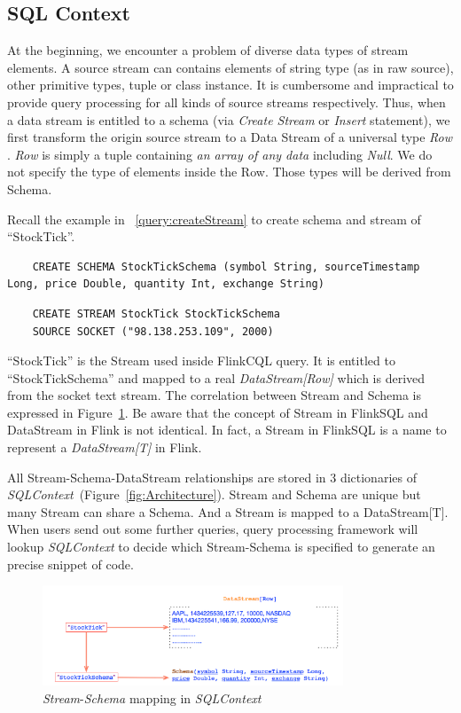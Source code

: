 \subsection{SQL Context} 

At the beginning, we encounter a problem of diverse data types of stream elements. A source stream can contains elements of string type (as in raw source), other primitive types, tuple or class instance. It is cumbersome and impractical to provide query processing for all kinds of source streams respectively. Thus, when a data stream is entitled to a schema (via \textit{Create Stream} or \textit{Insert} statement), we first transform the origin source stream to a Data Stream of a universal type \textit{Row} . \textit{Row} is simply a tuple containing \textit{an array of any data} including \textit{Null}. We do not specify the type of elements inside the Row. Those types will be derived from Schema.

Recall the example in ~\ref{query:createStream} to create schema and stream of ``StockTick''.
\begin{lstlisting}
	CREATE SCHEMA StockTickSchema (symbol String, sourceTimestamp Long, price Double, quantity Int, exchange String)
\end{lstlisting}

\begin{lstlisting} 
	CREATE STREAM StockTick StockTickSchema 
	SOURCE SOCKET ("98.138.253.109", 2000)
\end{lstlisting}

``StockTick'' is the Stream used inside FlinkCQL query. It is entitled to ``StockTickSchema'' and mapped to a real \textit{DataStream[Row]} which is derived from the socket text stream. The correlation between Stream and Schema is expressed in Figure~\ref{fig:SQLContext}. Be aware that the concept of Stream in FlinkSQL and DataStream in Flink is not identical. In fact, a Stream in FlinkSQL is a name to represent a \textit{DataStream[T]} in Flink.

All Stream-Schema-DataStream relationships are stored in 3 dictionaries of \textit{SQLContext}~(Figure~\ref{fig:Architecture}). 
Stream and Schema are unique but many Stream can share a Schema. And a Stream is mapped to a DataStream[T]. When users send out some further queries, query processing framework will lookup \textit{SQLContext} to decide which Stream-Schema is specified to generate an precise snippet of code.

\begin{figure}[h!] 
\centering    
\includegraphics[width=0.8\textwidth]{SQLContext}
\caption{\textit{Stream}-\textit{Schema} mapping in \textit{SQLContext}}
\label{fig:SQLContext}
\end{figure}

